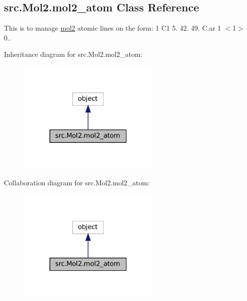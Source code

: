 \hypertarget{classsrc_1_1Mol2_1_1mol2__atom}{}\subsection{src.\+Mol2.\+mol2\+\_\+atom Class Reference}
\label{classsrc_1_1Mol2_1_1mol2__atom}


This is to manage \hyperlink{classsrc_1_1Mol2_1_1mol2}{mol2} atomic lines on the form\+: 1 C1 5. 42. 49. C.\+ar 1 $<$1$>$ 0..  




Inheritance diagram for src.\+Mol2.\+mol2\+\_\+atom\+:
\nopagebreak
\begin{figure}[H]
\begin{center}
\leavevmode
\includegraphics[width=196pt]{classsrc_1_1Mol2_1_1mol2__atom__inherit__graph}
\end{center}
\end{figure}


Collaboration diagram for src.\+Mol2.\+mol2\+\_\+atom\+:
\nopagebreak
\begin{figure}[H]
\begin{center}
\leavevmode
\includegraphics[width=196pt]{classsrc_1_1Mol2_1_1mol2__atom__coll__graph}
\end{center}
\end{figure}
